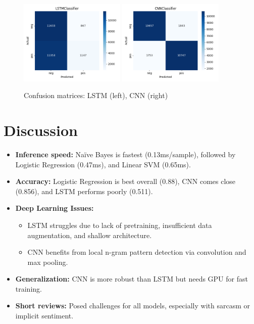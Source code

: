 \documentclass[12pt,a4paper]{article}
\begin{document}
\begin{figure}[H]
  \centering
  \includegraphics[width=0.45\textwidth]{figures/LSTMClassifier_confusion.png}
  \includegraphics[width=0.45\textwidth]{figures/CNNClassifier_confusion.png}
  \caption{Confusion matrices: LSTM (left), CNN (right)}
\end{figure}

\section{Discussion}
\begin{itemize}
  \item \textbf{Inference speed:} Naïve Bayes is fastest (0.13ms/sample), followed by Logistic Regression (0.47ms), and Linear SVM (0.65ms).
  \item \textbf{Accuracy:} Logistic Regression is best overall (0.88), CNN comes close (0.856), and LSTM performs poorly (0.511).
  \item \textbf{Deep Learning Issues:}
    \begin{itemize}
      \item LSTM struggles due to lack of pretraining, insufficient data augmentation, and shallow architecture.
      \item CNN benefits from local n-gram pattern detection via convolution and max pooling.
    \end{itemize}
  \item \textbf{Generalization:} CNN is more robust than LSTM but needs GPU for fast training.
  \item \textbf{Short reviews:} Posed challenges for all models, especially with sarcasm or implicit sentiment.
\end{itemize}
\end{document}
